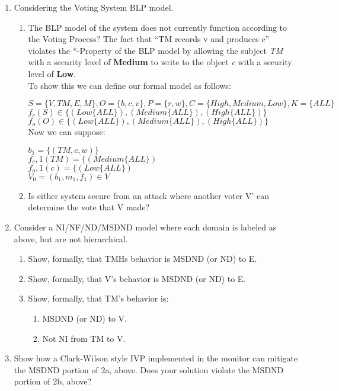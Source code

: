 \documentclass[journal,onecolumn]{IEEEtran}
\begin{document}
\begin{enumerate}
  \item Considering the Voting System BLP model. 
    \begin{enumerate}
      \item The BLP model of the system does not currently function according to the Voting Process? The fact that ``TM records v and produces c'' violates the *-Property of the BLP model by allowing the subject \textit{TM} with a security level of \textbf{Medium} to write to the object \textit{c} with a security level of \textbf{Low}. \\
      
      To show this we can define our formal model as follows:

      $S = \{V, TM, E, M\}, O = \{b, c, v\}, P = \{r, w\}, C = \{High, Medium, Low\}, K = \{ALL\}$\\
      $f_c(S) \in \{(Low \{ALL\}), (Medium \{ALL\}), (High \{ALL\}) \}$\\
      $f_o(O) \in \{(Low \{ALL\}), (Medium \{ALL\}), (High \{ALL\}) \}$\\

      Now we can suppose:

      $b_1=\{(TM, c, w)\}$\\
      $f_c,1(TM) = \{(Medium \{ALL\})$\\
      $f_o,1(c) = \{(Low \{ALL\})$\\
      $V_0 = (b_1,m_1,f_1) \in V$


      \item Is either system secure from an attack where another voter V' can determine the vote that V made?
    \end{enumerate}

  \item Consider a NI/NF/ND/MSDND model where each domain is labeled as above, but are not hierarchical. 
    \begin{enumerate}
      \item Show, formally, that TMHs behavior is MSDND (or ND) to E.
      \item Show, formally, that V's behavior is MSDND (or ND) to E. 
      \item Show, formally, that TM's behavior is:
      \begin{enumerate}
        \item MSDND (or ND) to V.
        \item Not NI from TM to V.
      \end{enumerate}
    \end{enumerate}
    \item Show how a Clark-Wilson style IVP implemented in the monitor can mitigate the MSDND portion of 2a, above.  Does your solution violate the MSDND portion of 2b, above?
\end{enumerate}
\end{document}
